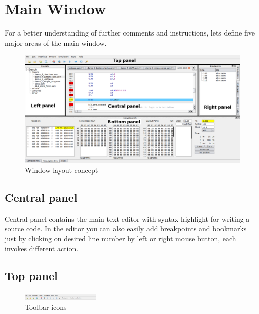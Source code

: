 \section{Main Window}
    For a better understanding of further comments and instructions, lets define five major areas of the main window.

   \begin{figure}[h]
        \centering
        \includegraphics[width=\textwidth]{img/Main_window.png}
        \caption{Window layout concept}
    \end{figure}

    \subsection{Central panel}
        Central panel contains the main text editor with syntax highlight for writing a source code. In the editor you can also easily add breakpoints and bookmarks just by clicking on desired line number by left or right mouse button, each invokes different action.

    \subsection{Top panel}
    \begin{figure}[h!]
            \centering
            \includegraphics[width=0.33\textwidth]{img/top_panel.png}
            \caption{Toolbar icons}
        \end{figure}

